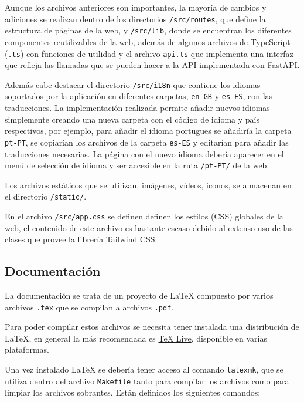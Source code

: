 Aunque los archivos anteriores son importantes, la mayoría de cambios y
adiciones se realizan dentro de los directorios \texttt{/src/routes}, que define
la estructura de páginas de la web, y \texttt{/src/lib}, donde se encuentran los
diferentes componentes reutilizables de la web, además de algunos archivos de
TypeScript (\texttt{.ts}) con funciones de utilidad y el archivo \texttt{api.ts}
que implementa una interfaz que refleja las llamadas que se pueden hacer a la
API implementada con FastAPI.

Además cabe destacar el directorio \texttt{/src/i18n} que contiene los idiomas
soportados por la aplicación en diferentes carpetas, \texttt{en-GB} y
\texttt{es-ES}, con las traducciones. La implementación realizada permite añadir
nuevos idiomas simplemente creando una nueva carpeta con el código de idioma y
país respectivos, por ejemplo, para añadir el idioma portugues se añadiría la
carpeta \texttt{pt-PT}, se copiarían los archivos de la carpeta \texttt{es-ES} y
editarían para añadir las traducciones necesarias. La página con el nuevo idioma
debería aparecer en el menú de selección de idioma y ser accesible en la ruta
\texttt{/pt-PT/} de la web.

Los archivos estáticos que se utilizan, imágenes, vídeos, iconos, se almacenan
en el directorio \texttt{/static/}.

En el archivo \texttt{/src/app.css} se definen definen los estilos (CSS)
globales de la web, el contenido de este archivo es bastante escaso debido al
extenso uso de las clases que provee la librería Tailwind CSS.

\subsection{Documentación}

La documentación se trata de un proyecto de \LaTeX{} compuesto por varios
archivos \texttt{.tex} que se compilan a archivos \texttt{.pdf}.

Para poder compilar estos archivos se necesita tener instalada una distribución
de \LaTeX{}, en general la más recomendada es
\href{https://www.tug.org/texlive/}{TeX Live}, disponible en varias plataformas.

Una vez instalado \LaTeX{} se debería tener acceso al comando \texttt{latexmk},
que se utiliza dentro del archivo \texttt{Makefile} tanto para compilar los
archivos como para limpiar los archivos sobrantes. Están definidos los
siguientes comandos:

